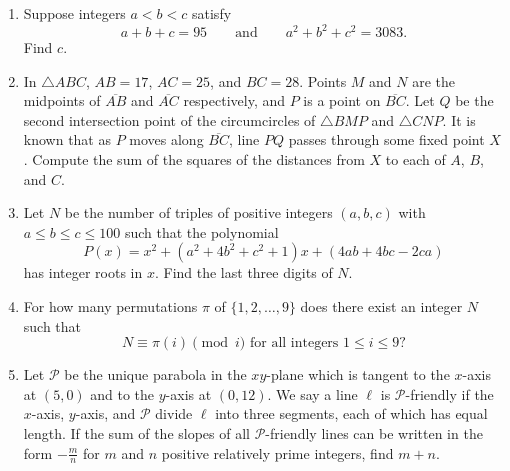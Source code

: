 \documentclass[10pt]{article}
\begin{document}
\begin{enumerate}
\item Suppose integers $a < b < c$ satisfy \[ a + b + c = 95\qquad\text{and}\qquad a^2 + b^2 + c^2 = 3083.\] Find $c$.

\item In $\triangle ABC$, $AB=17$, $AC=25$, and $BC=28$.  Points $M$ and $N$ are the midpoints of $\overline{AB}$ and $\overline{AC}$ respectively, and $P$ is a point on $\overline{BC}$.  Let $Q$ be the second intersection point of the circumcircles of $\triangle BMP$ and $\triangle CNP$.  It is known that as $P$ moves along $\overline{BC}$, line $PQ$ passes through some fixed point $X$.  Compute the sum of the squares of the distances from $X$ to each of $A$, $B$, and $C$. %

\item Let $N$ be the number of triples of positive integers $(a,b,c)$ with $a\leq b\leq c\leq 100$ such that the polynomial \[P(x)=x^2+(a^2+4b^2+c^2+1)x+(4ab+4bc-2ca)\] has integer roots in $x$.  Find the last three digits of $N$.

\item For how many permutations $\pi$ of $\{1,2,\ldots,9\}$ does there exist an integer $N$ such that \[N\equiv \pi(i)\pmod{i}\text{ for all integers }1\leq i\leq 9?\] %

\item Let $\mathcal{P}$ be the unique parabola in the $xy$-plane which is tangent to the $x$-axis at $(5,0)$ and to the $y$-axis at $(0,12)$.  We say a line $\ell$ is $\mathcal{P}$-friendly if the $x$-axis, $y$-axis, and $\mathcal{P}$ divide $\ell$ into three segments, each of which has equal length.  If the sum of the slopes of all $\mathcal{P}$-friendly lines can be written in the form $-\tfrac mn$ for $m$ and $n$ positive relatively prime integers, find $m+n$. %

\end{enumerate}
\end{document}
